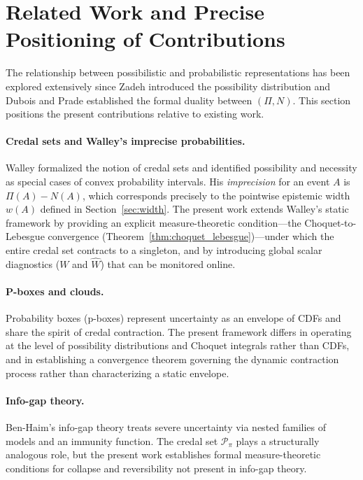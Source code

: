 \documentclass[12pt]{article}
\newcommand{\Ppi}{\mathcal{P}_\pi}
\begin{document}
\section{Related Work and Precise Positioning of Contributions}
\label{sec:related}

The relationship between possibilistic and probabilistic representations has been
explored extensively since Zadeh \cite{zadeh1978} introduced the possibility
distribution and Dubois and Prade \cite{dubois1988} established the formal
duality between $(\Pi,N)$.
This section positions the present contributions relative to existing work.

\paragraph{Credal sets and Walley's imprecise probabilities.}
Walley \cite{walley1991} formalized the notion of credal sets and identified
possibility and necessity as special cases of convex probability intervals.
His \emph{imprecision} for an event $A$ is $\Pi(A)-N(A)$, which corresponds
precisely to the pointwise epistemic width $w(A)$ defined in
Section~\ref{sec:width}.
The present work extends Walley's static framework by providing an explicit
measure-theoretic condition---the Choquet-to-Lebesgue convergence
(Theorem~\ref{thm:choquet_lebesgue})---under which the entire credal set
contracts to a singleton, and by introducing global scalar diagnostics
($W$ and $\widehat{W}$) that can be monitored online.

\paragraph{P-boxes and clouds.}
Probability boxes (p-boxes) \cite{ferson2003} represent uncertainty as an
envelope of CDFs and share the spirit of credal contraction.
The present framework differs in operating at the level of possibility
distributions and Choquet integrals rather than CDFs, and in establishing
a convergence theorem governing the dynamic contraction process rather than
characterizing a static envelope.

\paragraph{Info-gap theory.}
Ben-Haim's info-gap theory \cite{bengaim2006} treats severe uncertainty via
nested families of models and an immunity function.
The credal set $\Ppi$ plays a structurally analogous role, but the present
work establishes formal measure-theoretic conditions for collapse and
reversibility not present in info-gap theory.
\end{document}
